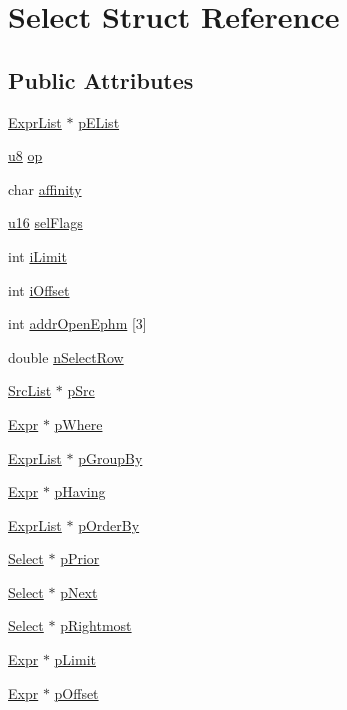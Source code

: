 \hypertarget{struct_select}{\section{Select Struct Reference}
\label{struct_select}
}
\subsection*{Public Attributes}
\begin{DoxyCompactItemize}
\item 
\hyperlink{struct_expr_list}{Expr\-List} $\ast$ \hyperlink{struct_select_acf92c5d6b0e0e6a3263a77696baaadc8}{p\-E\-List}
\item 
\hyperlink{sqlite3_8c_a74a0f6424ae628af25f23f0a35f6ead3}{u8} \hyperlink{struct_select_a84506d61248313b5e10f7891cb7482be}{op}
\item 
char \hyperlink{struct_select_a92417c2f75c710d2a7919b0d2e0b1d72}{affinity}
\item 
\hyperlink{sqlite3_8c_a20f2299e322dcbde37cb07b16910b843}{u16} \hyperlink{struct_select_a1c445561ea66d48573c8d8751108c743}{sel\-Flags}
\item 
int \hyperlink{struct_select_abf68908bf029af42a32c60a2558a8b1e}{i\-Limit}
\item 
int \hyperlink{struct_select_ac12bebd00ed988df3ad1efb8e6c63fe4}{i\-Offset}
\item 
int \hyperlink{struct_select_a5cad3b59bf1803be552d002e74bdfd47}{addr\-Open\-Ephm} \mbox{[}3\mbox{]}
\item 
double \hyperlink{struct_select_a177125317478139f9ce834e4f7a93c52}{n\-Select\-Row}
\item 
\hyperlink{struct_src_list}{Src\-List} $\ast$ \hyperlink{struct_select_a4e3b9b176a8e1b4af988405ff1f090db}{p\-Src}
\item 
\hyperlink{struct_expr}{Expr} $\ast$ \hyperlink{struct_select_a0562c1e19acde263a04af015611d8ce8}{p\-Where}
\item 
\hyperlink{struct_expr_list}{Expr\-List} $\ast$ \hyperlink{struct_select_a5b625c7495468ae56ca2f214a76231a0}{p\-Group\-By}
\item 
\hyperlink{struct_expr}{Expr} $\ast$ \hyperlink{struct_select_ad09e0b115e6e1599e3075b87dfa6e66e}{p\-Having}
\item 
\hyperlink{struct_expr_list}{Expr\-List} $\ast$ \hyperlink{struct_select_a73c474cd4a9a9b9aa4e3187d8bf2d886}{p\-Order\-By}
\item 
\hyperlink{struct_select}{Select} $\ast$ \hyperlink{struct_select_a51d1a253b0aba5a54b11b3bf3896d056}{p\-Prior}
\item 
\hyperlink{struct_select}{Select} $\ast$ \hyperlink{struct_select_a96aa0caf60390b8f5e88589639205c40}{p\-Next}
\item 
\hyperlink{struct_select}{Select} $\ast$ \hyperlink{struct_select_a6ee045fa4305f1d68be5bdc22555e624}{p\-Rightmost}
\item 
\hyperlink{struct_expr}{Expr} $\ast$ \hyperlink{struct_select_a11d3b48d04d58be818cdefb10aa061a0}{p\-Limit}
\item 
\hyperlink{struct_expr}{Expr} $\ast$ \hyperlink{struct_select_aeaf016a10203b911000354122562fb46}{p\-Offset}
\end{DoxyCompactItemize}


